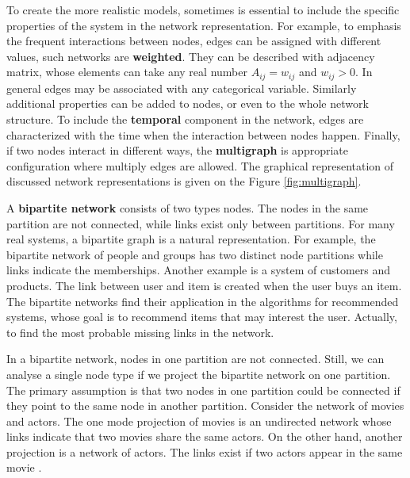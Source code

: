 To create the more realistic models, sometimes is essential to include the specific properties of the system in the network representation. For example, to emphasis the frequent interactions between nodes, edges can be assigned with different values, such networks are \textbf{weighted}. They can be described with adjacency matrix, whose elements can take any real number $A_{ij}=w_{ij}$ and $w_{ij}>0$. In general edges may be associated with any categorical variable. Similarly additional properties can be added to nodes, or even to the whole network structure. To include the \textbf{temporal} component in the network, edges are characterized with the time when the interaction between nodes happen. Finally, if two nodes interact in different ways, the \textbf{multigraph} is appropriate configuration where multiply edges are allowed. The graphical representation of discussed network representations is given on the Figure \ref{fig:multigraph}.

A \textbf{bipartite network} consists of two types nodes. The nodes in the same partition are not connected, while links exist only between partitions. For many real systems, a bipartite graph is a natural representation\cite{barabasi2016network, latora2017complex}. For example, the bipartite network of people and groups has two distinct node partitions while links indicate the memberships. Another example is a system of customers and products. The link between user and item is created when the user buys an item. The bipartite networks find their application in the algorithms for recommended systems, whose goal is to recommend items that may interest the user. Actually, to find the most probable missing links in the network. 

In a bipartite network, nodes in one partition are not connected. Still, we can analyse a single node type if we project the bipartite network on one partition. The primary assumption is that two nodes in one partition could be connected if they point to the same node in another partition. Consider the network of movies and actors. The one mode projection of movies is an undirected network whose links indicate that two movies share the same actors. On the other hand, another projection is a network of actors. The links exist if two actors appear in the same movie \cite{newman2010, barabasi2016network}.


